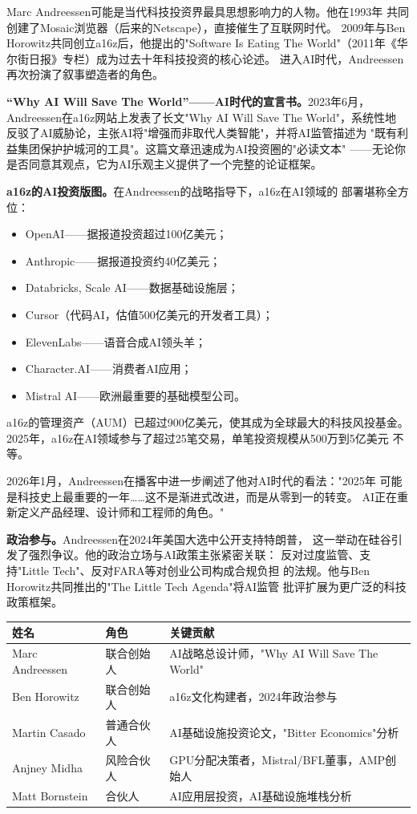 Marc Andreessen可能是当代科技投资界最具思想影响力的人物。他在1993年
共同创建了Mosaic浏览器（后来的Netscape），直接催生了互联网时代。
2009年与Ben Horowitz共同创立a16z后，他提出的"Software Is Eating The
World"（2011年《华尔街日报》专栏）成为过去十年科技投资的核心论述。
进入AI时代，Andreessen再次扮演了叙事塑造者的角色。

\textbf{``Why AI Will Save The World''——AI时代的宣言书。}2023年6月，
Andreessen在a16z网站上发表了长文"Why AI Will Save The World"，系统性地
反驳了AI威胁论，主张AI将"增强而非取代人类智能"，并将AI监管描述为
"既有利益集团保护护城河的工具"。这篇文章迅速成为AI投资圈的"必读文本"
——无论你是否同意其观点，它为AI乐观主义提供了一个完整的论证框架。

\textbf{a16z的AI投资版图。}在Andreessen的战略指导下，a16z在AI领域的
部署堪称全方位：
\begin{itemize}
  \item OpenAI——据报道投资超过100亿美元；
  \item Anthropic——据报道投资约40亿美元；
  \item Databricks, Scale AI——数据基础设施层；
  \item Cursor（代码AI，估值500亿美元的开发者工具）；
  \item ElevenLabs——语音合成AI领头羊；
  \item Character.AI——消费者AI应用；
  \item Mistral AI——欧洲最重要的基础模型公司。
\end{itemize}

a16z的管理资产（AUM）已超过900亿美元，使其成为全球最大的科技风投基金。
2025年，a16z在AI领域参与了超过25笔交易，单笔投资规模从500万到5亿美元
不等。

2026年1月，Andreessen在播客中进一步阐述了他对AI时代的看法："2025年
可能是科技史上最重要的一年……这不是渐进式改进，而是从零到一的转变。
AI正在重新定义产品经理、设计师和工程师的角色。"

\textbf{政治参与。}Andreessen在2024年美国大选中公开支持特朗普，
这一举动在硅谷引发了强烈争议。他的政治立场与AI政策主张紧密关联：
反对过度监管、支持"Little Tech"、反对FARA等对创业公司构成合规负担
的法规。他与Ben Horowitz共同推出的"The Little Tech Agenda"将AI监管
批评扩展为更广泛的科技政策框架。

\begin{keybox}[a16z AI团队核心人物]
\small
\begin{tabularx}{\textwidth}{l l X}
\toprule
\rowcolor{figLightGray}
\textbf{姓名} & \textbf{角色} & \textbf{关键贡献} \\
\midrule
Marc Andreessen & 联合创始人 & AI战略总设计师，"Why AI Will Save The World" \\
Ben Horowitz    & 联合创始人 & a16z文化构建者，2024年政治参与 \\
Martin Casado   & 普通合伙人 & AI基础设施投资论文，"Bitter Economics"分析 \\
Anjney Midha    & 风险合伙人 & GPU分配决策者，Mistral/BFL董事，AMP创始人 \\
Matt Bornstein  & 合伙人 & AI应用层投资，AI基础设施堆栈分析 \\
\bottomrule
\end{tabularx}
\end{keybox}


